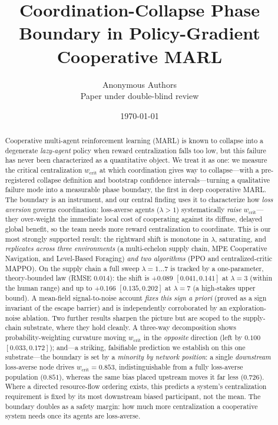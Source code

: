 \documentclass[letterpaper]{article}
\title{\textbf{Coordination-Collapse Phase Boundary in Policy-Gradient Cooperative MARL}}
\author{Anonymous Authors\\ Paper under double-blind review}
\date{\today}
\theoremstyle{plain}
\newcommand{\wcrit}{w_{\mathrm{crit}}}
\begin{document}
\maketitle

\begin{abstract}
Cooperative multi-agent reinforcement learning (MARL) is known to collapse
into a degenerate \emph{lazy-agent} policy when reward centralization falls
too low, but this failure has never been characterized as a quantitative
object. We treat it as one: we measure the critical centralization $\wcrit$
at which coordination gives way to collapse---with a pre-registered collapse
definition and bootstrap confidence intervals---turning a qualitative failure
mode into a measurable phase boundary, the first in deep cooperative MARL.
The boundary is an instrument, and our central finding uses it to characterize
how \emph{loss aversion} governs coordination: loss-averse agents
($\lambda>1$) systematically \emph{raise} $\wcrit$---they over-weight the
immediate local cost of cooperating against its diffuse, delayed global benefit,
so the team needs more reward centralization to coordinate. This is our most
strongly supported result: the rightward shift is monotone in $\lambda$,
saturating, and \emph{replicates across three environments} (a multi-echelon
supply chain, MPE Cooperative Navigation, and Level-Based Foraging) \emph{and two
algorithms} (PPO and centralized-critic MAPPO). On the supply chain a full sweep
$\lambda{=}1{\ldots}7$ is tracked by a one-parameter, theory-bounded law (RMSE
$0.014$): the shift is $+0.089$ $[0.041, 0.141]$ at $\lambda{=}3$ (within the
human range) and up to $+0.166$ $[0.135, 0.202]$ at $\lambda{=}7$ (a high-stakes
upper bound). A mean-field signal-to-noise account \emph{fixes this sign a priori}
(proved as a sign invariant of the escape barrier) and is independently
corroborated by an exploration-noise ablation. Two further results sharpen the
picture but are scoped to the supply-chain substrate, where they hold cleanly. A
three-way decomposition shows probability-weighting curvature moving $\wcrit$ in
the \emph{opposite} direction (left by $0.100$ $[0.033, 0.172]$); and---a
striking, falsifiable prediction we establish on this one substrate---the
boundary is set by a \emph{minority by network position}: a single
\emph{downstream} loss-averse node drives $\wcrit=0.853$, indistinguishable from
a fully loss-averse population ($0.851$), whereas the same bias placed upstream
moves it far less ($0.726$). Where a directed resource-flow ordering exists, this
predicts a system's centralization requirement is fixed by its most downstream
biased participant, not the mean. The boundary doubles as a safety margin: how
much more centralization a cooperative system needs once its agents are
loss-averse.
\end{abstract}
\end{document}
